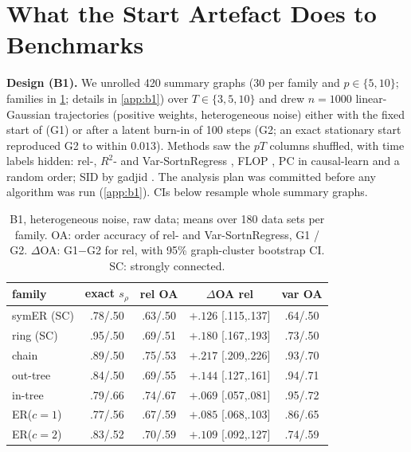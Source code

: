 \documentclass{article}
\theoremstyle{plain}
\theoremstyle{definition}
\theoremstyle{remark}
\newcommand{\srho}{s_\rho}
\begin{document}
\section{What the Start Artefact Does to Benchmarks}
\label{sec:b1}

\textbf{Design (B1).} We unrolled 420 summary graphs (30 per family and
$p\in\{5,10\}$; families in \cref{tab:b1}; details in \cref{app:b1}) over $T\in\{3,5,10\}$ and drew
$n=1000$ linear-Gaussian trajectories (positive weights, heterogeneous noise)
either with the fixed start of \citet{reisach2026topological} (G1) or after a
latent burn-in of 100 steps (G2; an exact stationary start reproduced G2 to
within $0.013$). Methods saw the $pT$ columns shuffled, with time labels
hidden: rel-, $R^2$- and Var-SortnRegress
\citep{reisach2026topological,reisach2023scale}, FLOP
\citep{wienobst2026flop}, PC \citep{spirtes2000causation} in causal-learn
\citep{zheng2024causallearn} and a random order; SID by gadjid
\citep{henckel2024gadjid}. The analysis plan was committed before any
algorithm was run (\cref{app:b1}). CIs below resample whole summary graphs.

\begin{table}[t]
\caption{B1, heterogeneous noise, raw data; means over 180 data sets per
family. OA: order accuracy of rel- and Var-SortnRegress, G1 / G2. $\Delta$OA:
G1$-$G2 for rel, with 95\% graph-cluster bootstrap CI. SC: strongly connected.}
\label{tab:b1}
\vskip 0.05in
\centering\scriptsize\setlength{\tabcolsep}{3pt}
\begin{tabular}{lcccc}
\toprule
family & exact $\srho$ & rel OA & $\Delta$OA rel & var OA\\
\midrule
symER (SC) & .78/.50 & .63/.50 & $+.126$ [.115,.137] & .64/.50\\
ring (SC)  & .95/.50 & .69/.51 & $+.180$ [.167,.193] & .73/.50\\
chain      & .89/.50 & .75/.53 & $+.217$ [.209,.226] & .93/.70\\
out-tree   & .84/.50 & .69/.55 & $+.144$ [.127,.161] & .94/.71\\
in-tree    & .79/.66 & .74/.67 & $+.069$ [.057,.081] & .95/.72\\
ER($c{=}1$)& .77/.56 & .67/.59 & $+.085$ [.068,.103] & .86/.65\\
ER($c{=}2$)& .83/.52 & .70/.59 & $+.109$ [.092,.127] & .74/.59\\
\bottomrule
\end{tabular}
\vskip -0.1in
\end{table}
\end{document}
